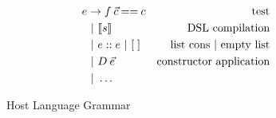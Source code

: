 \begin{figure}\footnotesize
\begin{center}
    \begin{align*}
       e & \to f\>\vec{c} \>\mathit{==}\> c & \text{test}\\
            &\ |\  \llbracket s \rrbracket & \text{DSL compilation} \\
            &\ |\ e :: e \ |\  [\;] & \text{list cons} \ |\  \text{empty list} \\
            &\ |\  D\>\vec{e} & \text{constructor application} \\
            &\ |\  \ldots & \\
    \end{align*}
\end{center}
    \caption{Host Language Grammar}
    \label{fig:the-host-language}
\end{figure}
